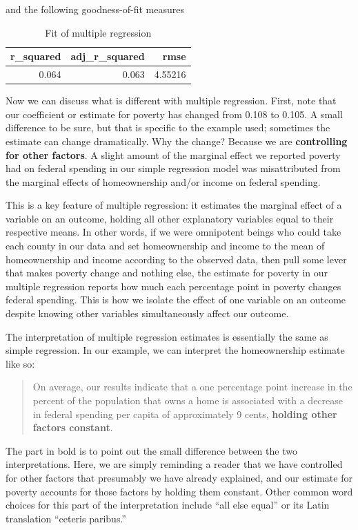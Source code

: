 \documentclass[
]{book}
\begin{document}
and the following goodness-of-fit measures

\begin{table}

\caption{\label{tab:multregexfit}Fit of multiple regression}
\centering
\begin{tabular}[t]{r|r|r}
\hline
r\_squared & adj\_r\_squared & rmse\\
\hline
0.064 & 0.063 & 4.55216\\
\hline
\end{tabular}
\end{table}

Now we can discuss what is different with multiple regression. First, note that our coefficient or estimate for poverty has changed from 0.108 to 0.105. A small difference to be sure, but that is specific to the example used; sometimes the estimate can change dramatically. Why the change? Because we are \textbf{controlling for other factors}. A slight amount of the marginal effect we reported poverty had on federal spending in our simple regression model was misattributed from the marginal effects of homeownership and/or income on federal spending.

This is a key feature of multiple regression: it estimates the marginal effect of a variable on an outcome, holding all other explanatory variables equal to their respective means. In other words, if we were omnipotent beings who could take each county in our data and set homeownership and income to the mean of homeownership and income according to the observed data, then pull some lever that makes poverty change and nothing else, the estimate for poverty in our multiple regression reports how much each percentage point in poverty changes federal spending. This is how we isolate the effect of one variable on an outcome despite knowing other variables simultaneously affect our outcome.

The interpretation of multiple regression estimates is essentially the same as simple regression. In our example, we can interpret the homeownership estimate like so:

\begin{quote}
On average, our results indicate that a one percentage point increase in the percent of the population that owns a home is associated with a decrease in federal spending per capita of approximately 9 cents, \textbf{holding other factors constant}.
\end{quote}

The part in bold is to point out the small difference between the two interpretations. Here, we are simply reminding a reader that we have controlled for other factors that presumably we have already explained, and our estimate for poverty accounts for those factors by holding them constant. Other common word choices for this part of the interpretation include ``all else equal'' or its Latin translation ``ceteris paribus.''
\end{document}
